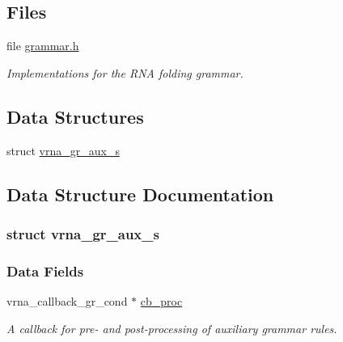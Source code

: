 \subsection*{Files}
\begin{DoxyCompactItemize}
\item 
file \mbox{\hyperlink{grammar_8h}{grammar.\+h}}
\begin{DoxyCompactList}\small\item\em Implementations for the R\+NA folding grammar. \end{DoxyCompactList}\end{DoxyCompactItemize}
\subsection*{Data Structures}
\begin{DoxyCompactItemize}
\item 
struct \mbox{\hyperlink{group__grammar_structvrna__gr__aux__s}{vrna\+\_\+gr\+\_\+aux\+\_\+s}}
\end{DoxyCompactItemize}


\subsection{Data Structure Documentation}
\label{structvrna__gr__aux__s}
\subsubsection{struct vrna\+\_\+gr\+\_\+aux\+\_\+s}
\subsubsection*{Data Fields}
\begin{DoxyCompactItemize}
\item 
\mbox{\label{group__grammar_ad4b601db6dc2e18854042b096ee780cc}} 
vrna\+\_\+callback\+\_\+gr\+\_\+cond $\ast$ \mbox{\hyperlink{group__grammar_ad4b601db6dc2e18854042b096ee780cc}{cb\+\_\+proc}}
\begin{DoxyCompactList}\small\item\em A callback for pre-\/ and post-\/processing of auxiliary grammar rules. \end{DoxyCompactList}\end{DoxyCompactItemize}
